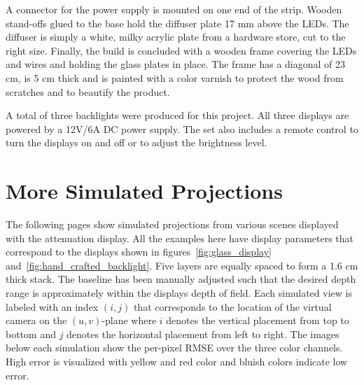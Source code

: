 A connector for the power supply is mounted on one end of the strip.
Wooden stand-offs glued to the base hold the diffuser plate 17 mm above the LEDs.
The diffuser is simply a white, milky acrylic plate from a hardware store, cut to the right size.
Finally, the build is concluded with a wooden frame covering the LEDs and wires and holding the glass plates in place.
The frame has a diagonal of 23 cm, is 5 cm thick and is painted with a color varnish to protect the wood from scratches and to beautify the product.

A total of three backlights were produced for this project.
All three displays are powered by a 12V/6A DC power supply.
The set also includes a remote control to turn the displays on and off or to adjust the brightness level.

\section{More Simulated Projections}
\label{sec:simulated_projections}

The following pages show simulated projections from various scenes displayed with the attenuation display.
All the examples here have display parameters that correspond to the displays shown in figures~\ref{fig:glass_display} and~\ref{fig:hand_crafted_backlight}.
Five layers are equally spaced to form a 1.6 cm thick stack.
The baseline has been manually adjusted such that the desired depth range is approximately within the displays depth of field.
Each simulated view is labeled with an index $(i, j)$ that corresponds to the location of the virtual camera on the \mbox{$(u, v)$-plane} where $i$ denotes the vertical placement from top to bottom and $j$ denotes the horizontal placement from left to right.
The images below each simulation show the per-pixel \mbox{RMSE} over the three color channels.
High error is visualized with yellow and red color and bluish colors indicate low error.

